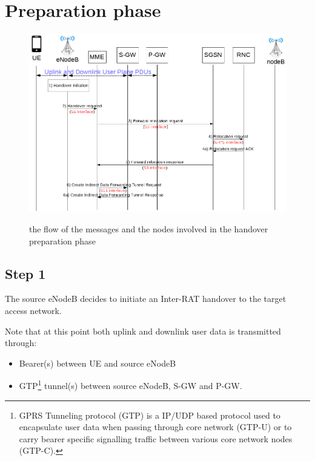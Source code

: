 \section{Preparation phase}
\begin{figure}[htb]
	\centering
	\includegraphics[width=1\linewidth]{img/preparation-phase.png}
	\label{fig:preparation-phase}
	\caption{the flow of the messages and the nodes involved in the
	handover preparation phase}
\end{figure}

\subsection*{Step 1}
The source eNodeB decides to initiate an Inter-RAT handover to the target access network.

Note that at this point both uplink and downlink user data is transmitted through:
\begin{itemize}
	\item Bearer(s) between UE and source eNodeB
	\item GTP\footnote{GPRS Tunneling protocol (GTP) is a IP/UDP based protocol used to
	encapsulate user data when passing through core network (GTP-U) or to carry bearer
	specific signalling traffic between various core network nodes (GTP-C).} tunnel(s)
	between	source eNodeB, S-GW and P-GW.
\end{itemize}


